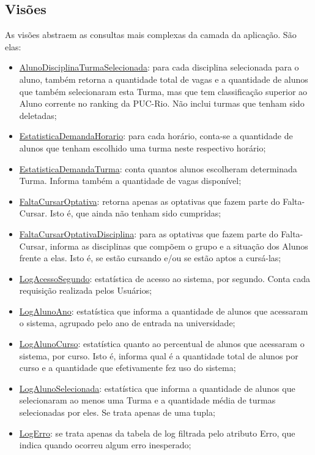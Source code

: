 \documentclass[graduacao,brazil]{ThesisPUC}
\begin{document}
\subsection{Visões}

As visões abstraem as consultas mais complexas da camada da aplicação. São elas:

\begin{itemize}
	\item \underline{AlunoDisciplinaTurmaSelecionada}: para cada disciplina selecionada para o aluno, também retorna a quantidade total de vagas e a quantidade de alunos que também selecionaram esta Turma, mas que tem classificação superior ao Aluno corrente no ranking da PUC-Rio. Não inclui turmas que tenham sido deletadas;
	\item \underline{EstatisticaDemandaHorario}: para cada horário, conta-se a quantidade de alunos que tenham escolhido uma turma neste respectivo horário;
	\item \underline{EstatisticaDemandaTurma}: conta quantos alunos escolheram determinada Turma. Informa também a quantidade de vagas disponível;
	\item \underline{FaltaCursarOptativa}: retorna apenas as optativas que fazem parte do Falta-Cursar. Isto é, que ainda não tenham sido cumpridas;
	\item \underline{FaltaCursarOptativaDisciplina}: para as optativas que fazem parte do Falta-Cursar, informa as disciplinas que compõem o grupo e a situação dos Alunos frente a elas. Isto é, se estão cursando e/ou se estão aptos a cursá-las;
	\item \underline{LogAcessoSegundo}: estatística de acesso ao sistema, por segundo. Conta cada requisição realizada pelos Usuários;
	\item \underline{LogAlunoAno}: estatística que informa a quantidade de alunos que acessaram o sistema, agrupado pelo ano de entrada na universidade;
	\item \underline{LogAlunoCurso}: estatística quanto ao percentual de alunos que acessaram o sistema, por curso. Isto é, informa qual é a quantidade total de alunos por curso e a quantidade que efetivamente fez uso do sistema;
	\item \underline{LogAlunoSelecionada}: estatística que informa a quantidade de alunos que selecionaram ao menos uma Turma e a quantidade média de turmas selecionadas por eles. Se trata apenas de uma tupla;
	\item \underline{LogErro}: se trata apenas da tabela de log filtrada pelo atributo Erro, que indica quando ocorreu algum erro inesperado;

\end{itemize}
\end{document}
